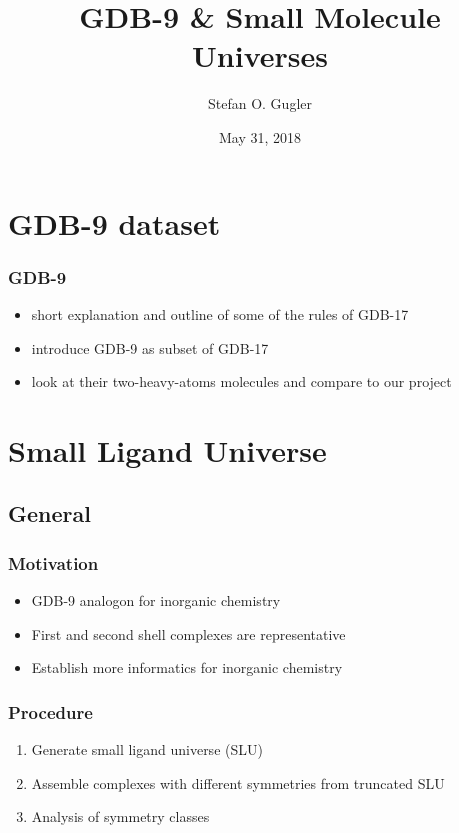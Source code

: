 \documentclass[xcolor=dvipsnames]{beamer}
\title[Group Meeting]{GDB-9 \& Small Molecule Universes}
\date{May 31, 2018}
\author[Stefan O. Gugler]
{Stefan O. Gugler}
\institute[MIT]{Massachusetts Institute of Technology  \\Department of Chemical Engineering}
\begin{document}
	
\begin{frame}
	\titlepage
\end{frame}
%
\begin{frame}
	\tableofcontents
\end{frame}

\section{GDB-9 dataset}
\begin{frame}
\frametitle{GDB-9}
\begin{itemize}
\item short explanation and outline of some of the rules of GDB-17
\item introduce GDB-9 as subset of GDB-17
\item look at their two-heavy-atoms molecules and compare to our project
\end{itemize}
	
\end{frame}

\section{Small Ligand Universe}
\subsection{General}
\begin{frame}
\frametitle{Motivation}
\begin{itemize}
\item GDB-9 analogon for inorganic chemistry
\item First and second shell complexes are representative
\item Establish more informatics for inorganic chemistry
\end{itemize}
\end{frame}

%

\begin{frame}
\frametitle{Procedure}
\begin{enumerate}
\item Generate small ligand universe (SLU)
\item Assemble complexes with different symmetries from truncated SLU
\item Analysis of symmetry classes 
\end{enumerate}
\end{frame}
\end{document}
